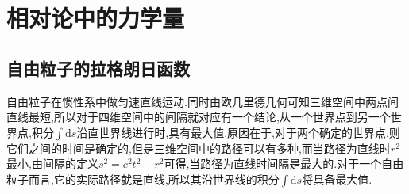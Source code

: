 \section{相对论中的力学量}

\subsection{自由粒子的拉格朗日函数}

自由粒子在惯性系中做匀速直线运动.同时由欧几里德几何可知三维空间中两点间直线最短,所以对于四维空间中的间隔就对应有一个结论,从一个世界点到另一个世界点,积分$\int \mathrm{d}s$沿直世界线进行时,具有最大值.原因在于,对于两个确定的世界点,则它们之间的时间是确定的,但是三维空间中的路径可以有多种,而当路径为直线时$r^2$最小,由间隔的定义$s^2=c^2t^2-r^2$可得,当路径为直线时间隔是最大的.对于一个自由粒子而言,它的实际路径就是直线,所以其沿世界线的积分$\int \mathrm{d}s$将具备最大值.

